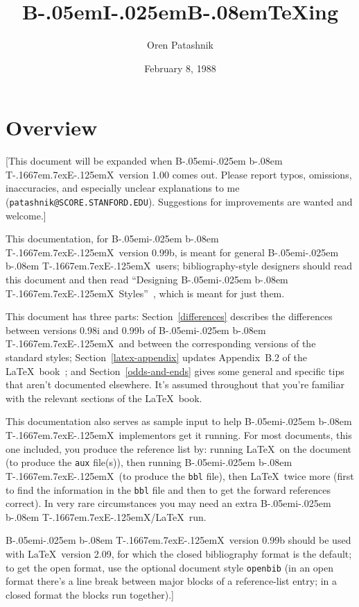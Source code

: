 
\def\BibTeX{{\rm B\kern-.05em{\sc i\kern-.025em b}\kern-.08em
    T\kern-.1667em\lower.7ex\hbox{E}\kern-.125emX}}

\title{B\kern-.05em{\large I}\kern-.025em{\large B}\kern-.08em\TeX ing}
\author{Oren Patashnik}
\date{February 8, 1988}



\maketitle

\section{Overview}

[This document will be expanded when \BibTeX\ version 1.00 comes out.
Please report typos, omissions, inaccuracies,
and especially unclear explanations
to me ({\tt patashnik@SCORE.STANFORD.EDU}).
Suggestions for improvements are wanted and welcome.]

This documentation, for \BibTeX\ version 0.99b,
is meant for general \BibTeX\ users;
bibliography-style designers should read this document
and then read ``Designing \BibTeX\ Styles''~\cite{btxhak},
which is meant for just them.

This document has three parts:
Section~\ref{differences}
describes the differences between versions 0.98i and 0.99b
of \BibTeX\ and between the corresponding versions of the standard styles;
Section~\ref{latex-appendix}
updates Appendix~B.2 of the \LaTeX\ book~\cite{latex};
and Section~\ref{odds-and-ends}
gives some general and specific tips
that aren't documented elsewhere.
It's assumed throughout that you're familiar with
the relevant sections of the \LaTeX\ book.

This documentation also serves as sample input to help
\BibTeX\ implementors get it running.
For most documents, this one included, you produce the reference list by:
running \LaTeX\ on the document (to produce the {\tt aux} file(s)),
then running \BibTeX\ (to produce the {\tt bbl} file),
then \LaTeX\ twice more (first to find the information in the {\tt bbl} file
and then to get the forward references correct).
In very rare circumstances you may need an extra \BibTeX/\LaTeX\ run.

\BibTeX\ version 0.99b should be used with \LaTeX\ version 2.09,
for which the closed bibliography format is the default;
to get the open format, use the optional document style {\tt openbib}
(in an open format there's a line break between major blocks of a
reference-list entry; in a closed format the blocks run together).]


